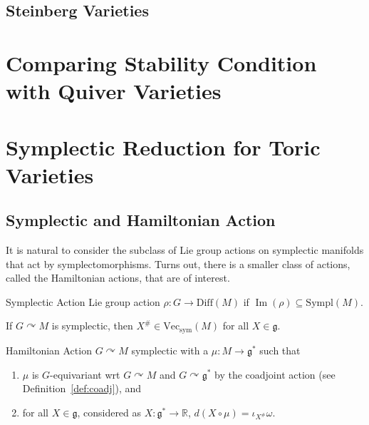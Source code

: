 \documentclass[b5paper,final]{article}
\renewcommand{\im}{\operatorname{Im}}
\newcommand{\Diff}{\mathrm{Diff}}
\newcommand{\Sympl}{\mathrm{Sympl}}
\newcommand{\acton}{\curvearrowright}
\newcommand{\svf}{\mathrm{Vec}_\mathrm{sym}}
\newcommand{\ind}[1]{#1^\#}
\newcommand{\intd}[1]{\iota_{#1}}
\begin{document}
\subsection{Steinberg Varieties}

\section{Comparing Stability Condition with Quiver Varieties}

\appendix
\section{Symplectic Reduction for Toric Varieties}

\subsection{Symplectic and Hamiltonian Action}

It is natural to consider the subclass of Lie group actions on symplectic manifolds that act by symplectomorphisms. Turns out, there is a smaller class of actions, called the Hamiltonian actions, that are of interest.

\begin{definition}{Symplectic Action}
    Lie group action $\rho : G \to \Diff(M)$ if $\im(\rho) \subseteq \Sympl(M)$.
\end{definition}

\begin{proposition}{}
    If $G \acton M$ is symplectic, then $\ind{X} \in \svf(M)$ for all $X \in \mathfrak{g}$.
\end{proposition}

\begin{definition}{Hamiltonian Action}
    $G \acton M$ symplectic with a  $\mu : M \to \mathfrak{g}^*$ such that
    \begin{enumerate}
        \item $\mu$ is $G$-equivariant wrt $G \acton M$ and $G \acton \mathfrak{g}^*$ by the coadjoint action (see Definition~\ref{def:coadj}), and
        \item for all $X \in \mathfrak{g}$, considered as $X : \mathfrak{g}^* \to \mathbb{R}$, $d(X \circ \mu) = \intd{\ind{X}}\omega$.
    \end{enumerate}
\end{definition}

\end{document}
